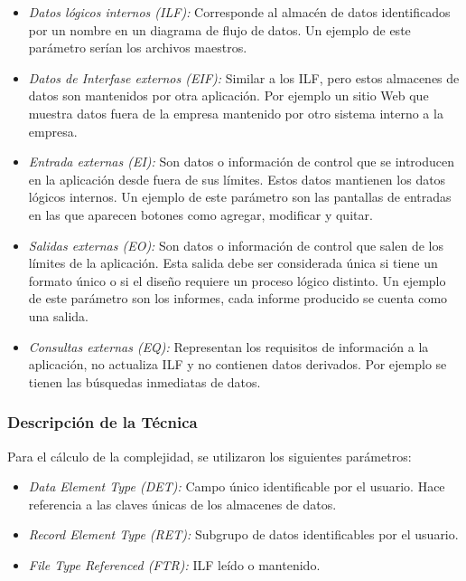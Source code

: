  \begin{itemize}
 
\item \emph{Datos lógicos internos (ILF):} Corresponde al almacén de datos identificados por un nombre en un diagrama de flujo de datos. Un ejemplo de este parámetro serían los archivos maestros.
 
\item \emph{Datos de Interfase externos (EIF):} Similar a los ILF, pero estos almacenes de datos son mantenidos por otra aplicación. Por ejemplo un sitio Web  que muestra datos fuera de la empresa mantenido por otro sistema interno a la empresa.
 
\item \emph{Entrada externas (EI):} Son datos o información de control que se introducen en la aplicación desde fuera de sus límites. Estos datos mantienen los datos lógicos internos. Un ejemplo de este parámetro son las pantallas de entradas en las que aparecen botones como agregar, modificar y quitar.
 
\item \emph{Salidas externas (EO):} Son datos o información de control que salen de los límites de la aplicación. Esta salida debe ser considerada única si tiene un formato único o si el diseño requiere un proceso lógico distinto.  Un ejemplo de este parámetro son los informes, cada informe producido se cuenta como una salida.
 
\item \emph{Consultas externas (EQ):} Representan los requisitos de información a la aplicación, no actualiza ILF y no contienen datos derivados. Por ejemplo se tienen las búsquedas inmediatas de datos.
 \end{itemize}

      \subsubsection{Descripción de la Técnica}
      
      Para el cálculo de la complejidad, se utilizaron los siguientes parámetros:
     
\begin{itemize}
 
    \item \emph{Data Element Type (DET):} Campo único identificable por el usuario. Hace referencia a las claves únicas de los almacenes de datos.

\item \emph{Record Element Type (RET):} Subgrupo de datos identificables por el usuario.

\item \emph{File Type Referenced (FTR):} ILF leído o mantenido.

\end{itemize}
